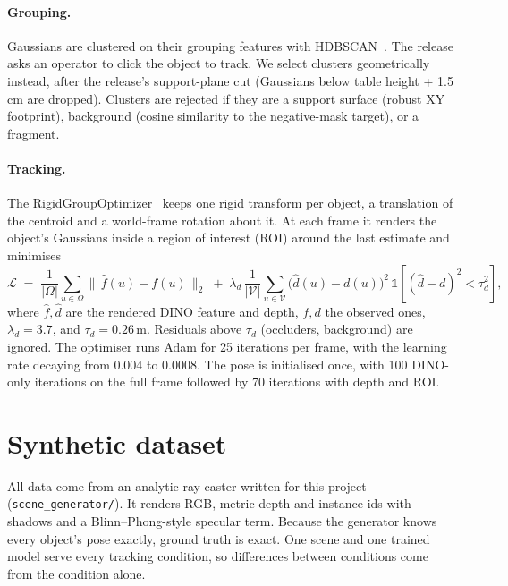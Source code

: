 \documentclass[10pt,a4paper]{article}
\begin{document}
\paragraph{Grouping.} Gaussians are clustered on their grouping features with
HDBSCAN~\cite{hdbscan}. The release asks an operator to click the object to
track. We select clusters geometrically instead, after the release's
support-plane cut (Gaussians below table height + 1.5\,cm are dropped). Clusters
are rejected if they are a support surface (robust XY footprint), background
(cosine similarity to the negative-mask target), or a fragment.

\paragraph{Tracking.} The RigidGroupOptimizer~\cite{rsrd,pogs} keeps one rigid
transform per object, a translation of the centroid and a world-frame
rotation about it. At each frame it renders the object's Gaussians inside a
region of interest (ROI) around the last estimate and minimises
\begin{equation}
  \mathcal{L} \;=\; \frac{1}{|\Omega|}\sum_{u\in\Omega}\big\|\,\hat f(u) - f(u)\,\big\|_2
  \;+\; \lambda_d\,\frac{1}{|\mathcal{V}|}\sum_{u\in\mathcal{V}}\big(\hat d(u)-d(u)\big)^2\,
  \mathbb{1}\!\left[(\hat d - d)^2 < \tau_d^2\right],
  \label{eq:trackloss}
\end{equation}
where $\hat f, \hat d$ are the rendered DINO feature and depth, $f, d$ the
observed ones, $\lambda_d = 3.7$, and $\tau_d = 0.26$\,m. Residuals above
$\tau_d$ (occluders, background) are ignored. The optimiser runs Adam for
25 iterations per frame, with the learning rate decaying from 0.004 to 0.0008.
The pose is initialised once, with 100 DINO-only iterations on the full frame
followed by 70 iterations with depth and ROI.

\section{Synthetic dataset}
\label{sec:dataset}

All data come from an analytic ray-caster written for this project
(\texttt{scene\_generator/}). It renders RGB, metric depth and instance ids with
shadows and a Blinn--Phong-style specular term. Because the generator knows every
object's pose exactly, ground truth is exact. One scene and one trained model
serve every tracking condition, so differences between conditions come from the
condition alone.
\end{document}
